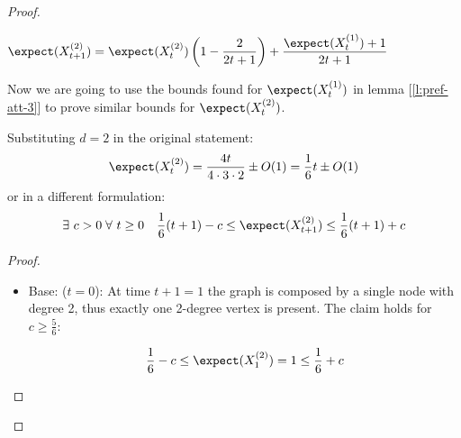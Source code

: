\begin{proof}
    \begin{lemma}\label{l:pref-att-5}
        $\displaystyle \expect(X_{t + 1}^{(2)}) = \expect(X_t^{(2)}) \left( 1 - \frac{2}{2t + 1} \right) + \frac{\expect(X_t^{(1)}) + 1}{2t + 1}$
    \end{lemma}
    

    Now we are going to use the bounds found for $\expect(X_t^{(1)})$ in lemma [\ref{l:pref-att-3}] to prove similar bounds for $\expect(X_t^{(2)})$.
    
    \begin{lemma}\label{l:pref-att-6} Substituting $d = 2$ in the original statement:
        \[
            \expect(X_t^{(2)}) = \frac{4 t}{4 \cdot 3 \cdot 2} \pm O(1) = \frac{1}{6} t \pm O(1)
        \]
        or in a different formulation:
        \[
            \exists\ c > 0\; \forall\ t\geq 0 \quad \frac{1}{6} (t + 1) - c \leq \expect( X_{t + 1}^{(2)} ) \leq \frac{1}{6} (t + 1) + c
        \]
    \end{lemma}

    \begin{proof}

        \begin{itemize}
            \item Base: ($t = 0$): At time $t + 1 = 1$ the graph is composed by a single node with degree 2, thus exactly one 2-degree vertex is present. The claim holds for $c \geq \frac{5}{6}$:

            \[
                \frac{1}{6} - c \leq \expect(X_1^{(2)}) = 1 \leq \frac{1}{6} + c
            \]


\end{itemize}
\end{proof}
\end{proof}
